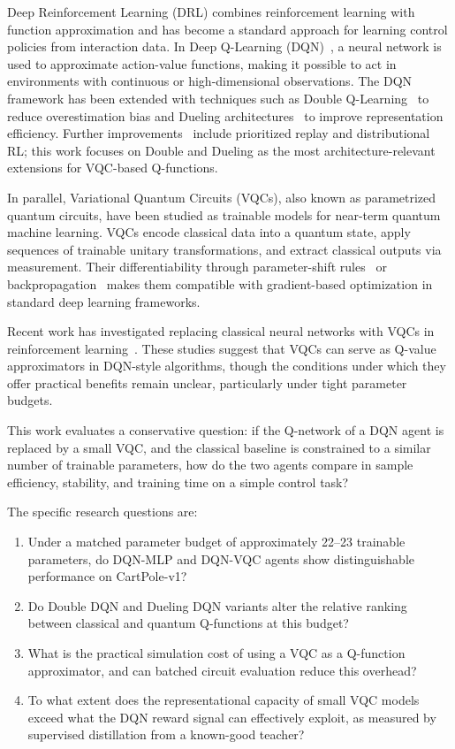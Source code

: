 Deep Reinforcement Learning (DRL) combines reinforcement learning
\cite{sutton2018rl} with function approximation and has become a standard
approach for learning control policies from interaction data. In Deep
Q-Learning (DQN)~\cite{mnih2015dqn}, a neural network is used to approximate
action-value functions, making it possible to act in environments with
continuous or high-dimensional observations. The DQN framework has been
extended with techniques such as Double Q-Learning~\cite{vanhasselt2016double}
to reduce overestimation bias and Dueling architectures~\cite{wang2016dueling}
to improve representation efficiency. Further improvements~\cite{hessel2018rainbow}
include prioritized replay and distributional RL; this work focuses on Double
and Dueling as the most architecture-relevant extensions for VQC-based Q-functions.

In parallel, Variational Quantum Circuits (VQCs), also known as parametrized
quantum circuits, have been studied as trainable models for near-term quantum
machine learning. VQCs encode classical data into a quantum state, apply
sequences of trainable unitary transformations, and extract classical outputs
via measurement. Their differentiability through parameter-shift rules~\cite{schuld2019parameter}
or backpropagation~\cite{perez2020reuploading} makes them compatible with
gradient-based optimization in standard deep learning frameworks.

Recent work has investigated replacing classical neural networks with VQCs in
reinforcement learning~\cite{chen2020vqc,jerbi2021pqc,skolik2022quantum}.
These studies suggest that VQCs can serve as Q-value approximators in DQN-style
algorithms, though the conditions under which they offer practical benefits
remain unclear, particularly under tight parameter budgets.

This work evaluates a conservative question: if the Q-network of a DQN agent is
replaced by a small VQC, and the classical baseline is constrained to a similar
number of trainable parameters, how do the two agents compare in sample
efficiency, stability, and training time on a simple control task?

The specific research questions are:

\begin{enumerate}
  \item Under a matched parameter budget of approximately 22--23 trainable
        parameters, do DQN-MLP and DQN-VQC agents show distinguishable
        performance on CartPole-v1?
  \item Do Double DQN and Dueling DQN variants alter the relative ranking
        between classical and quantum Q-functions at this budget?
  \item What is the practical simulation cost of using a VQC as a Q-function
        approximator, and can batched circuit evaluation reduce this overhead?
  \item To what extent does the representational capacity of small VQC models
        exceed what the DQN reward signal can effectively exploit, as measured
        by supervised distillation from a known-good teacher?
\end{enumerate}

